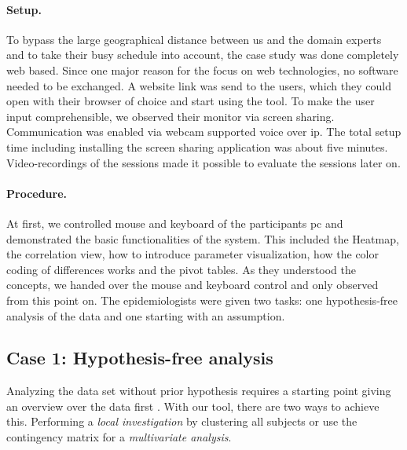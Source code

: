 \documentclass[journal]{style/vgtc} 			          %
\begin{document}
\paragraph{Setup.} To bypass the large geographical distance between us and the domain experts and to take their busy schedule into account, the case study was done completely web based.
%
Since one major reason for the focus on web technologies, no software needed to be exchanged.
%
A website link was send to the users, which they could open with their browser of choice and start using the tool.
%
To make the user input comprehensible, we observed their monitor via screen sharing.
%
Communication was enabled via webcam supported voice over ip.
%
The total setup time including installing the screen sharing application was about five minutes.
%
Video-recordings of the sessions made it possible to evaluate the sessions later on.
%
\paragraph{Procedure.}
At first, we controlled mouse and keyboard of the participants pc and demonstrated the basic functionalities of the system.
%
This included the Heatmap, the correlation view, how to introduce parameter visualization, how the color coding of differences works and the pivot tables.
%
As they understood the concepts, we handed over the mouse and keyboard control and only observed from this point on.
%
The epidemiologists were given two tasks: one hypothesis-free analysis of the data and one starting with an assumption.

\subsection{Case 1: Hypothesis-free analysis}
Analyzing the data set without prior hypothesis requires a starting point giving an overview over the data first \cite{Shneiderman1996}.
%
With our tool, there are two ways to achieve this.
%
Performing a \emph{local investigation} by clustering all subjects or use the contingency matrix for a \emph{multivariate analysis}.
\end{document}
